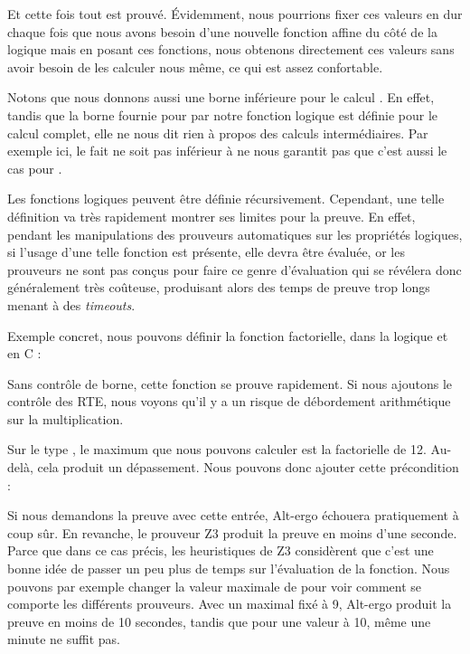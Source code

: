 Et cette fois tout est prouvé. Évidemment, nous pourrions fixer ces valeurs en 
dur chaque fois que nous avons besoin d'une nouvelle fonction affine du côté de
la logique mais en posant ces fonctions, nous obtenons directement ces valeurs 
sans avoir besoin de les calculer nous même, ce qui est assez confortable.


Notons que nous donnons aussi une borne inférieure pour le calcul .
En effet, tandis que la borne fournie pour  par notre fonction logique
est définie pour le calcul complet, elle ne nous dit rien à propos des calculs
intermédiaires. Par exemple ici, le fait  ne soit pas inférieur
à  ne nous garantit pas que c'est aussi le cas pour
.





Les fonctions logiques peuvent être définie récursivement. Cependant, une telle
définition va très rapidement montrer ses limites pour la preuve. En effet, 
pendant les manipulations des prouveurs automatiques sur les propriétés 
logiques, si l'usage d'une telle fonction est présente, elle devra être évaluée,
or les prouveurs ne sont pas conçus pour faire ce genre d'évaluation qui se 
révélera donc généralement très coûteuse, produisant alors des temps de preuve
trop longs menant à des \textit{timeouts}.



Exemple concret, nous pouvons définir la fonction factorielle, dans la logique
et en C :






Sans contrôle de borne, cette fonction se prouve rapidement. Si nous ajoutons
le contrôle des RTE, nous voyons qu'il y a un risque de débordement
arithmétique sur la multiplication.



Sur le type , le maximum que nous pouvons calculer est la factorielle de 
12. Au-delà, cela produit un dépassement. Nous pouvons donc ajouter cette 
précondition :






Si nous demandons la preuve avec cette entrée, Alt-ergo échouera pratiquement à 
coup sûr. En revanche, le prouveur Z3 produit la preuve en moins d'une seconde.
Parce que dans ce cas précis, les heuristiques de Z3 considèrent que c'est une
bonne idée de passer un peu plus de temps sur l'évaluation de la fonction. Nous
pouvons par exemple changer la valeur maximale de  pour voir comment se 
comporte les différents prouveurs. Avec un  maximal fixé à 9, Alt-ergo produit
la preuve en moins de 10 secondes, tandis que pour une valeur à 10, même une 
minute ne suffit pas.



